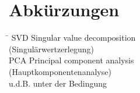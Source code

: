 \chapter*{Abkürzungen}
\begin{tabbing}
    \hspace{4cm} \= \kill
    SVD \>  Singular value decomposition\\
        \>  (Singulärwertzerlegung) \\[6pt] 
    PCA \> Principal component analysis\\
        \> (Hauptkomponentenanalyse) \\[6pt] 
    u.d.B. \>  unter der Bedingung \\
\end{tabbing}